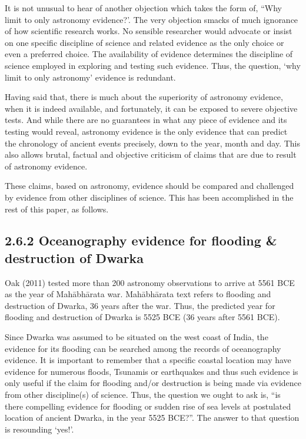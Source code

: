 It is not unusual to hear of another objection which takes the form of, “Why limit to only astronomy evidence?’. The very objection smacks of much ignorance of how scientific research works. No sensible researcher would advocate or insist on one specific discipline of science and related evidence as the only choice or even a preferred choice. The availability of evidence determines the discipline of science employed in exploring and testing such evidence. Thus, the question, ‘why limit to only astronomy’ evidence is redundant.

Having said that, there is much about the superiority of astronomy evidence, when it is indeed available, and fortunately, it can be exposed to severe objective tests. And while there are no guarantees in what any piece of evidence and its testing would reveal, astronomy evidence is the only evidence that can predict the chronology of ancient events precisely, down to the year, month and day. This also allows brutal, factual and objective criticism of claims that are due to result of astronomy evidence.

These claims, based on astronomy, evidence should be compared and challenged by evidence from other disciplines of science. This has been accomplished in the rest of this paper, as follows.

\newpage

\subsection*{2.6.2 Oceanography evidence for flooding \& destruction of Dwarka}

Oak (2011) tested more than 200 astronomy observations to arrive at 5561 BCE as the year of Mahābhārata war. Mahābhārata text refers to flooding and destruction of Dwarka, 36 years after the war. Thus, the predicted year for flooding and destruction of Dwarka is 5525 BCE (36 years after 5561 BCE).

Since Dwarka was assumed to be situated on the west coast of India, the evidence for its flooding can be searched among the records of oceanography evidence. It is important to remember that a specific coastal location may have evidence for numerous floods, Tsunamis or earthquakes and thus such evidence is only useful if the claim for flooding and/or destruction is being made via evidence from other discipline(s) of science. Thus, the question we ought to ask is, “is there compelling evidence for flooding or sudden rise of sea levels at postulated location of ancient Dwarka, in the year 5525 BCE?”. The answer to that question is resounding ‘yes!’.

